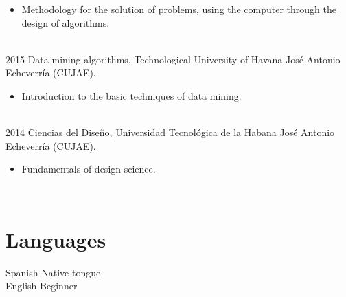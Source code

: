 \documentclass[letterpaper]{twentysecondcv} %
\begin{document}
\begin{twenty}
{{\begin{itemize}
        \item Methodology for the solution of problems, using the computer through the design of algorithms.
		\end{itemize}}
        }
        \\
\twentyitem
    	{2015}
		{}
        {Data mining algorithms, Technological University of Havana José Antonio
Echeverría (CUJAE).}
        {}
        {}
        {
        {\begin{itemize}
        \item Introduction to the basic techniques of data mining.
		\end{itemize}}
        }
         \\
\twentyitem
    	{2014}
		{}
        {Ciencias del Diseño, Universidad Tecnológica de la Habana José Antonio
Echeverría (CUJAE).}
        {}
        {}
        {
        {\begin{itemize}
        \item Fundamentals of design science.
		\end{itemize}}
        }

\end{twenty}
\pagebreak

\begin{twenty}
\twentyitem
    	{}
		{}
        {}
        {}
        {}
        {}
        \\
 \end{twenty} 
\section{Languages}

\begin{twenty} %
\twentyitem
    	{Spanish}
		{}
        {Native tongue}
        {}
        {}
        {}
        \\
	\twentyitem
    	{English}
		{}
        {Beginner}
        {}
        {}
        {}


\end{twenty}

\end{document}
